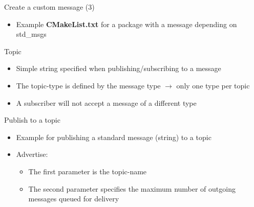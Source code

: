 \documentclass{beamer}
\begin{document}
\begin{frame}[fragile]{Create a custom message (3)}
	\begin{itemize}
		\item Example \textbf{CMakeList.txt} for a package with a message depending on std\_msgs
	\end{itemize}
			
\end{frame}
\begin{frame}{Topic}
	\begin{itemize}
		\item Simple string specified when publishing/subscribing to a message
	\end{itemize}
	
	\begin{itemize}
		\item The topic-type is defined by the message type $\rightarrow$ only one type per topic
		\item A subscriber will not accept a message of a different type
	\end{itemize}	
\end{frame}	
\begin{frame}{Publish to a topic}
	\begin{itemize}
		\item Example for publishing a standard message (string) to a topic
		
		\item Advertise:
		\begin{itemize}
			\item The first parameter is the topic-name
			\item The second parameter specifies the maximum number of outgoing messages queued for delivery			
		\end{itemize}
	\end{itemize}
\end{frame}	
\end{document}

